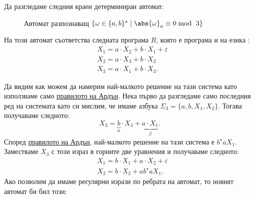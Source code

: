 \begin{example}
  Да разгледаме следния краен детерминиран автомат:
  \begin{figure}[H]
    \centering
    \caption{Автомат разпознаващ $\{\omega \in \{a,b\}^\star \mid \abs{\omega}_{a} \equiv 0 \bmod\ 3\}$}
  \end{figure}
  На този автомат съответства следната програма $R$, която е програма и на езика \REGPP:
  \begin{align*}
    & X_1 = a \cdot X_2 + b \cdot X_1 + \varepsilon \\
    & X_2 = a \cdot X_3 + b \cdot X_2\\
    & X_3 = a \cdot X_1 + b \cdot X_3.
  \end{align*}

  Да видим как можем да намерим най-малкото решение на тази система като използваме само \hyperref[prob:reg:arden]{правилото на Ардън}.
  Нека първо да разгледаме само последния ред на системата като си мислим, че имаме азбука $\Sigma_3 = \{a,b,X_1,X_2\}$. Тогава получаваме следното:
  \[X_3 = \underbrace{b}_{\alpha} \cdot X_3 + \underbrace{a \cdot X_1}_{\beta}.\]
  Според \hyperref[prob:reg:arden]{правилото на Ардън}, най-малкото решение на тази система е $b^\star a X_1$.
  Заместваме $X_3$ с този израз в горните две уравнения и получаваме следното:
  \begin{align*}
    & X_1 = b \cdot X_1 + a \cdot X_2 + \varepsilon \\
    & X_2 = b \cdot X_2 + a b^\star a X_1.
  \end{align*}
  Ако позволим да имаме регулярни изрази по ребрата на автомат, то новият автомат би бил този:


\end{example}
